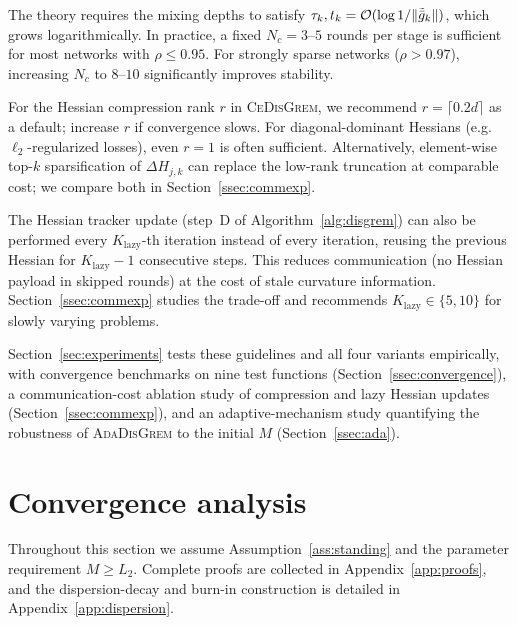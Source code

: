 \documentclass[review,onefignum,onetabnum]{siamart171218}
\begin{document}
	The theory requires the mixing depths to satisfy
	$\tau_k, t_k = \mathcal{O}(\log 1/\|\tilde{\bar g}_k\|)$, which grows
	logarithmically. In practice, a fixed $N_c = 3$--$5$ rounds per stage is sufficient
	for most networks with $\rho \le 0.95$.
	For strongly sparse networks ($\rho > 0.97$), increasing $N_c$ to $8$--$10$
	significantly improves stability.

	For the Hessian compression rank $r$ in \textsc{CeDisGrem},
	we recommend $r = \lceil 0.2d \rceil$ as a default; increase $r$ if convergence slows.
	For diagonal-dominant Hessians (e.g.\ $\ell_2$-regularized losses), even $r=1$
	is often sufficient.
	Alternatively, element-wise top-$k$ sparsification of $\Delta H_{j,k}$
	can replace the low-rank truncation at comparable cost; we compare both in
	Section~\ref{ssec:commexp}.

	The Hessian tracker update (step~D of Algorithm~\ref{alg:disgrem}) can also be
	performed every $K_{\mathrm{lazy}}$-th iteration instead of every iteration,
	reusing the previous Hessian for $K_{\mathrm{lazy}}{-}1$ consecutive steps.
	This reduces communication (no Hessian payload in skipped rounds) at the cost
	of stale curvature information.
	Section~\ref{ssec:commexp} studies the trade-off and recommends
	$K_{\mathrm{lazy}}\in\{5,10\}$ for slowly varying problems.
	
	Section~\ref{sec:experiments} tests these guidelines and all four
	variants empirically, with convergence benchmarks on nine test functions
	(Section~\ref{ssec:convergence}), a communication-cost ablation study
	of compression and lazy Hessian updates (Section~\ref{ssec:commexp}),
	and an adaptive-mechanism study quantifying the robustness of
	\textsc{AdaDisGrem} to the initial $M$ (Section~\ref{ssec:ada}).
	
	
\section{Convergence analysis}\label{sec:theory}
Throughout this section we assume Assumption~\ref{ass:standing}
and the parameter requirement $M\ge L_2$.
Complete proofs are collected in Appendix~\ref{app:proofs}, and the
dispersion-decay and burn-in construction is detailed in
Appendix~\ref{app:dispersion}.
\end{document}
